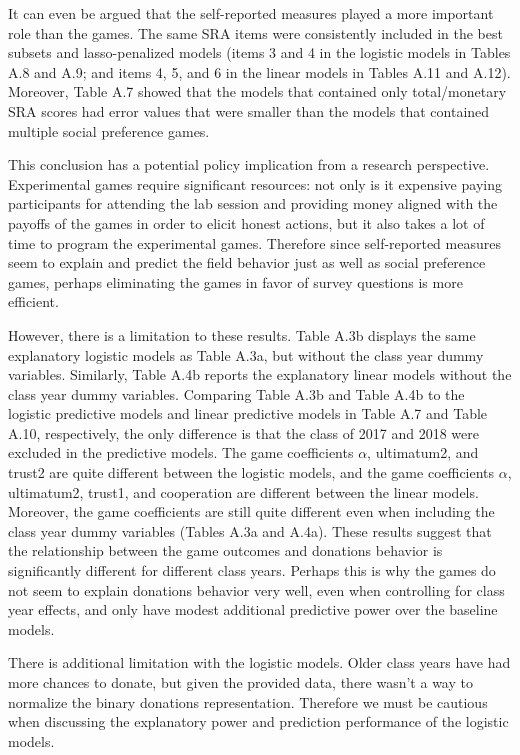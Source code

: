 \documentclass[12pt]{article}
\begin{document}
It can even be argued that the self-reported measures played a more important role than the games. The same SRA items were consistently included in the best subsets and lasso-penalized models (items 3 and 4 in the logistic models in Tables A.8 and A.9; and items 4, 5, and 6 in the linear models in Tables A.11 and A.12). Moreover, Table A.7 showed that the models that contained only total/monetary SRA scores had error values that were smaller than the models that contained multiple social preference games.

This conclusion has a potential policy implication from a research perspective. Experimental games require significant resources: not only is it expensive paying participants for attending the lab session and providing money aligned with the payoffs of the games in order to elicit honest actions, but it also takes a lot of time to program the experimental games. Therefore since self-reported measures seem to explain and predict the field behavior just as well as social preference games, perhaps eliminating the games in favor of survey questions is more efficient.

However, there is a limitation to these results. Table A.3b displays the same explanatory logistic models as Table A.3a, but without the class year dummy variables. Similarly, Table A.4b reports the explanatory linear models without the class year dummy variables. Comparing Table A.3b and Table A.4b to the logistic predictive models and linear predictive models in Table A.7 and Table A.10, respectively, the only difference is that the class of 2017 and 2018 were excluded in the predictive models. The game coefficients \(\alpha\), ultimatum2, and trust2 are quite different between the logistic models, and the game coefficients \(\alpha\), ultimatum2, trust1, and cooperation are different between the linear models. Moreover, the game coefficients are still quite different even when including the class year dummy variables (Tables A.3a and A.4a). These results suggest that the relationship between the game outcomes and donations behavior is significantly different for different class years. Perhaps this is why the games do not seem to explain donations behavior very well, even when controlling for class year effects, and only have modest additional predictive power over the baseline models.

There is additional limitation with the logistic models. Older class years have had more chances to donate, but given the provided data, there wasn\rq t a way to normalize the binary donations representation. Therefore we must be cautious when discussing the explanatory power and prediction performance of the logistic models.
\end{document}
